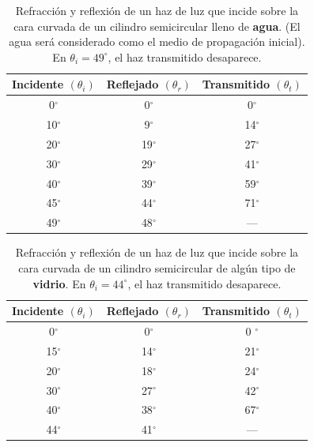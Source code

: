 \documentclass[
aps,
reprint,
amsmath, amssymb,
superscriptaddress,
]{revtex4-2}
\begin{document}
\begin{table}[H]%
    \caption{\label{tab:tabla2} Refracción y reflexión de un haz de luz que incide sobre la cara curvada de un cilindro semicircular lleno de \textbf{agua}. (El agua será considerado como el medio de propagación inicial). En $\theta_i = 49^{\circ}$, el haz transmitido desaparece.}
     \begin{ruledtabular}
     \begin{tabular}{ccc}
        Incidente $(\theta_i)$ & Reflejado $(\theta_r)$ & Transmitido $(\theta_t)$\\
        \hline
         0$^{\circ}$ &  0$^{\circ}$ & 0$^{\circ}$ \\
        10$^{\circ}$ &  9$^{\circ}$ & 14$^{\circ}$ \\
        20$^{\circ}$ & 19$^{\circ}$ & 27$^{\circ}$ \\
        30$^{\circ}$ & 29$^{\circ}$ & 41$^{\circ}$ \\
        40$^{\circ}$ & 39$^{\circ}$ & 59$^{\circ}$ \\
        45$^{\circ}$ & 44$^{\circ}$ & 71$^{\circ}$ \\
        49$^{\circ}$ & 48$^{\circ}$ & --- \\
     \end{tabular}
     \end{ruledtabular}
\end{table}

\begin{table}[H]%
    \caption{\label{tab:tabla 5} Refracción y reflexión de un haz de luz que incide sobre la cara curvada de un cilindro semicircular de algún tipo de \textbf{vidrio}. En $\theta_i = 44^{\circ}$, el haz transmitido desaparece.}
     \begin{ruledtabular}
     \begin{tabular}{ccc}
        Incidente $(\theta_i)$ & Reflejado $(\theta_r)$ & Transmitido $(\theta_t)$\\
        \hline
         0$^{\circ}$ &  0$^{\circ}$ & 0 $^{\circ}$ \\
        15$^{\circ}$ & 14$^{\circ}$ & 21$^{\circ}$ \\
        20$^{\circ}$ & 18$^{\circ}$ & 24$^{\circ}$ \\
        30$^{\circ}$ & 27$^{\circ}$ & 42$^{\circ}$ \\
        40$^{\circ}$ & 38$^{\circ}$ & 67$^{\circ}$ \\  44$^{\circ}$ & 41$^{\circ}$ & --- 
     \end{tabular}
     \end{ruledtabular}
\end{table}
\end{document}
